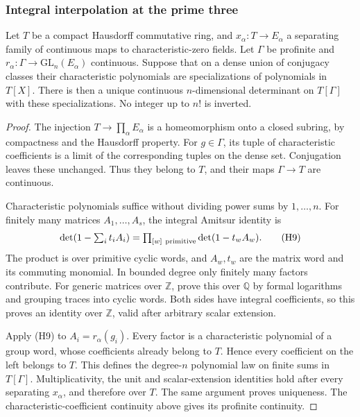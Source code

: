 \subsubsection{Integral interpolation at the prime three}
\begin{srlemma}\label{lem:sr-compact-determinant-interpolation}
Let \(T\) be a compact Hausdorff commutative ring, and
\(x_\alpha:T\to E_\alpha\) a separating family of continuous
maps to characteristic-zero fields.
Let \(\Gamma\) be profinite and
\(r_\alpha:\Gamma\to\mathrm{GL}_n(E_\alpha)\) continuous.
Suppose that on a dense union of conjugacy classes their
characteristic polynomials are specializations of
polynomials in \(T[X]\).
There is then a unique continuous \(n\)-dimensional
determinant on \(T[\Gamma]\) with these specializations.
No integer up to \(n!\) is inverted.
\end{srlemma}
\begin{proof}
The injection \(T\to\prod_\alpha E_\alpha\) is a
homeomorphism onto a closed subring, by compactness and
the Hausdorff property.
For \(g\in\Gamma\), its tuple of characteristic coefficients
is a limit of the corresponding tuples on the dense set.
Conjugation leaves these unchanged.
Thus they belong to \(T\), and their maps \(\Gamma\to T\)
are continuous.

Characteristic polynomials suffice without dividing power
sums by \(1,\ldots,n\).
For finitely many matrices \(A_1,\ldots,A_s\), the integral
Amitsur identity is
\[
 \det(1-\textstyle\sum_i t_iA_i)
       =\prod_{[w]\ {\rm primitive}}\det(1-t_wA_w).
 \tag{H9}
\]
The product is over primitive cyclic words, and \(A_w,t_w\)
are the matrix word and its commuting monomial.
In bounded degree only finitely many factors contribute.
For generic matrices over \(\mathbb Z\), prove this over
\(\mathbb Q\) by formal logarithms and grouping traces
into cyclic words.
Both sides have integral coefficients, so this proves
an identity over \(\mathbb Z\), valid after arbitrary
scalar extension.

Apply (H9) to \(A_i=r_\alpha(g_i)\).
Every factor is a characteristic polynomial of a group
word, whose coefficients already belong to \(T\).
Hence every coefficient on the left belongs to \(T\).
This defines the degree-\(n\) polynomial law on finite
sums in \(T[\Gamma]\).
Multiplicativity, the unit and scalar-extension identities
hold after every separating \(x_\alpha\), and therefore
over \(T\). The same argument proves uniqueness.
The characteristic-coefficient continuity above gives
its profinite continuity.
\end{proof}

